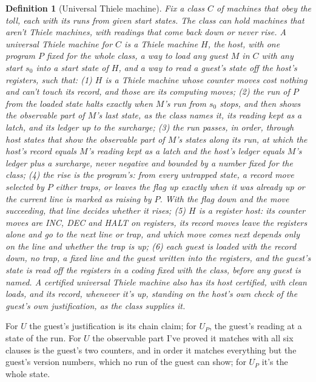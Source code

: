 \documentclass[11pt,twoside]{article}
\theoremstyle{thielethm}
\theoremstyle{thieledef}
\newtheorem{definition}{Definition}[section]
\theoremstyle{thieledef}
\theoremstyle{thieledef}
\theoremstyle{thielethm}
\theoremstyle{thieleobs}
\theoremstyle{thielethm}
\begin{document}
\begin{definition}[Universal Thiele machine]\label{def:universal-thiele}
Fix a class $C$ of machines that obey the toll, each with its runs from given start states. The
class can hold machines that aren't Thiele machines, with readings that come back down or never
rise. A \emph{universal Thiele machine for} $C$ is a Thiele machine $H$, the \emph{host}, with one program
$P$ fixed for the whole class, a way to load any guest $M$ in $C$ with any start $s_0$ into a
start state of $H$, and a way to read a guest's state off the host's registers, such that:
(1) $H$ is a Thiele machine whose counter moves cost nothing and can't touch its record, and
those are its computing moves;
(2) the run of $P$ from the loaded state halts exactly when $M$'s run from $s_0$ stops, and then
shows the observable part of $M$'s last state, as the class names it, its reading kept as a latch, and its ledger up to the surcharge;
(3) the run passes, in order, through host states that show the observable part of $M$'s states
along its run, at which
the host's record equals $M$'s reading kept as a latch and the host's ledger equals $M$'s ledger
plus a surcharge, never negative and bounded by a number fixed for the class;
(4) \emph{the rise is the program's}: from every untrapped state, a record
move selected by $P$ either traps, or leaves the flag up exactly when it was
already up or the current line is marked as raising by $P$. With the flag
down and the move succeeding, that line decides whether it rises;
(5) $H$ is a \emph{register host}: its counter moves are INC, DEC and HALT on registers, its record
moves leave the registers alone and go to the next line or trap, and which move comes next depends
only on the line and whether the trap is up;
(6) each guest is loaded with the record down, no trap, a fixed line and the guest written into the
registers, and the guest's state is read off the registers in a coding fixed with the class,
before any guest is named.
A \emph{certified} universal Thiele machine also has its host certified, with clean
loads, and its record, whenever it's up, standing on the host's own check of the guest's own
justification, as the class supplies it.
\end{definition}

For $U$ the guest's justification is its chain claim; for $U_P$, the guest's reading at a state of
the run. For $U$ the observable part I've proved it matches with all six clauses is the guest's two
counters, and in order it matches everything but the guest's version numbers, which no run of the
guest can show; for $U_P$ it's the whole state.
\end{document}
